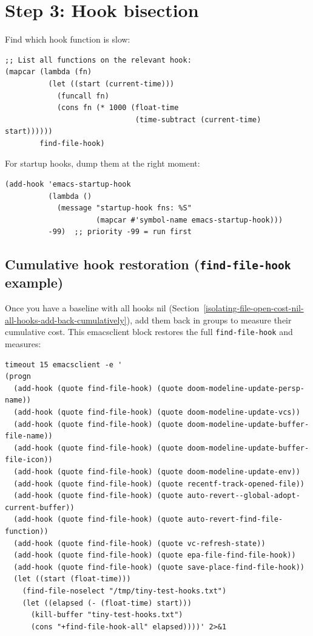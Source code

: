 \section{Step 3: Hook bisection}\label{step-3-hook-bisection}

Find which hook function is slow:

\begin{verbatim}
;; List all functions on the relevant hook:
(mapcar (lambda (fn)
          (let ((start (current-time)))
            (funcall fn)
            (cons fn (* 1000 (float-time
                              (time-subtract (current-time) start))))))
        find-file-hook)
\end{verbatim}

For startup hooks, dump them at the right moment:

\begin{verbatim}
(add-hook 'emacs-startup-hook
          (lambda ()
            (message "startup-hook fns: %S"
                     (mapcar #'symbol-name emacs-startup-hook)))
          -99)  ;; priority -99 = run first
\end{verbatim}

\subsection{Cumulative hook restoration (\texttt{find-file-hook} example)}\label{cumulative-hook-restoration-find-file-hook-example}

Once you have a baseline with all hooks nil (Section~\ref{isolating-file-open-cost-nil-all-hooks-add-back-cumulatively}), add them back in groups to measure their cumulative cost. This emacsclient block restores the full \texttt{find-file-hook} and measures:

\begin{verbatim}
timeout 15 emacsclient -e '
(progn
  (add-hook (quote find-file-hook) (quote doom-modeline-update-persp-name))
  (add-hook (quote find-file-hook) (quote doom-modeline-update-vcs))
  (add-hook (quote find-file-hook) (quote doom-modeline-update-buffer-file-name))
  (add-hook (quote find-file-hook) (quote doom-modeline-update-buffer-file-icon))
  (add-hook (quote find-file-hook) (quote doom-modeline-update-env))
  (add-hook (quote find-file-hook) (quote recentf-track-opened-file))
  (add-hook (quote find-file-hook) (quote auto-revert--global-adopt-current-buffer))
  (add-hook (quote find-file-hook) (quote auto-revert-find-file-function))
  (add-hook (quote find-file-hook) (quote vc-refresh-state))
  (add-hook (quote find-file-hook) (quote epa-file-find-file-hook))
  (add-hook (quote find-file-hook) (quote save-place-find-file-hook))
  (let ((start (float-time)))
    (find-file-noselect "/tmp/tiny-test-hooks.txt")
    (let ((elapsed (- (float-time) start)))
      (kill-buffer "tiny-test-hooks.txt")
      (cons "+find-file-hook-all" elapsed))))' 2>&1
\end{verbatim}

